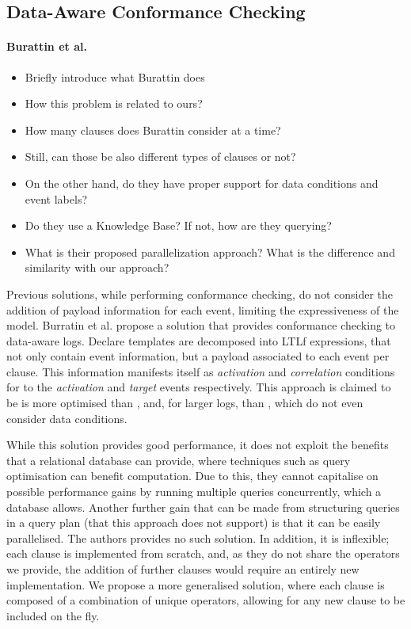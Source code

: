 \subsection{Data-Aware Conformance Checking}

\paragraph*{Burattin et al.}
\begin{itemize}
	\item{Briefly introduce what Burattin does}
	\item{How this problem is related to ours?}
	\item{How many clauses does Burattin consider at a time?}
	\item{Still, can those be also different types of clauses or not?}
	\item{On the other hand, do they have proper support for data conditions and event labels?}
	\item{Do they use a Knowledge Base? If not, how are they querying?}
	\item{What is their proposed parallelization approach? What is the difference and similarity with our approach?}
\end{itemize}
Previous solutions, while performing conformance checking, do not consider the addition of payload information for each event, limiting the expressiveness of the model. Burratin et al. \cite{BurattinMS16} propose a solution that provides conformance checking to data-aware logs. Declare templates are decomposed into LTLf expressions, that not only contain event information, but a payload associated to each event per clause. This information manifests itself as \emph{activation} and \emph{correlation} conditions for to the \emph{activation} and \emph{target} events respectively. This approach is claimed to be is more optimised than \cite{VanDerAalst2005}, and, for larger logs, than \cite{Burattin2012}, which do not even consider data conditions. 

While this solution provides good performance, it does not exploit the benefits that a relational database can provide, where techniques such as query optimisation can benefit computation. Due to this, they cannot capitalise on possible performance gains by running multiple queries concurrently, which a database allows. Another further gain that can be made from structuring queries in a query plan (that this approach does not support) is that it can be easily parallelised. The authors provides no such solution. In addition, it is inflexible; each clause is implemented from scratch, and, as they do not share the operators we provide, the addition of further clauses would require an entirely new implementation. We propose a more generalised solution, where each clause is composed of a combination of unique operators, allowing for any new clause to be included on the fly. 


